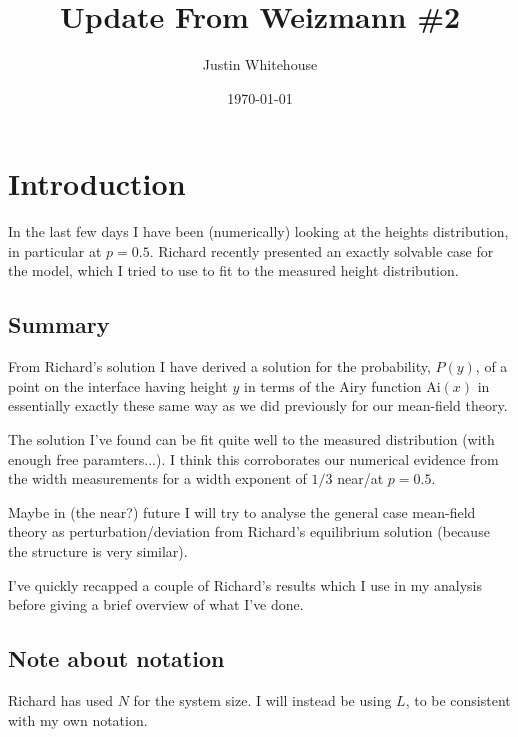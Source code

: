 \documentclass[a4paper,10pt]{article}
\title{Update From Weizmann \#2}
\author{Justin Whitehouse}
\date{\today}
\newcommand{\Ai}{\mathrm{Ai}}
\begin{document}
\maketitle


\tableofcontents
\newpage

\section{Introduction}

In the last few days I have been (numerically) looking at the heights distribution, in particular at $p = 0.5$. Richard recently presented an exactly solvable case for the model, which I tried to use to fit to the measured height distribution.

\subsection{Summary}

From Richard's solution I have derived a solution for the probability, $P(y)$, of a point on the interface having height $y$ in terms of the Airy function $\Ai(x)$ in essentially exactly these same way as we did previously for our mean-field theory. 

The solution I've found can be fit quite well to the measured distribution (with enough free paramters...). I think this corroborates our numerical evidence from the width measurements for a width exponent of $1/3$ near/at $p=0.5$.

Maybe in (the near?) future I will try to analyse the general case mean-field theory as perturbation/deviation from Richard's equilibrium solution (because the structure is very similar).

I've quickly recapped a couple of Richard's results which I use in my analysis before giving a brief overview of what I've done.

\subsection{Note about notation}

Richard has used $N$ for the system size. I will instead be using $L$, to be consistent with my own notation.

\end{document}
